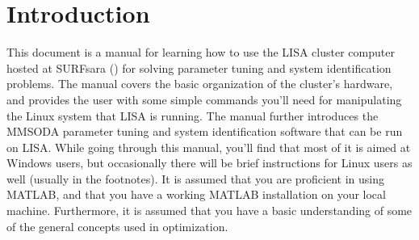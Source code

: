 \chapter{Introduction}
\label{ch:introduction}


This document is a manual for learning how to use the LISA cluster computer hosted at SURFsara () for solving parameter tuning and system identification problems. The manual covers the basic organization of the cluster's hardware, and provides the user with some simple commands you'll need for manipulating the Linux system that LISA is running. The manual further introduces the MMSODA parameter tuning and system identification software that can be run on LISA. While going through this manual, you'll find that most of it is aimed at Windows users, but occasionally there will be brief instructions for Linux users as well (usually in the footnotes). It is assumed that you are proficient in using MATLAB, and that you have a working MATLAB installation on your local machine. Furthermore, it is assumed that you have a basic understanding of some of the general concepts used in optimization.

\setcounter{smallqcounter}{0}
